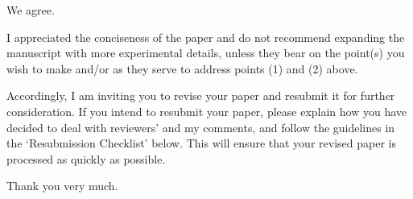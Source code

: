 \documentclass{article}
\newenvironment{response}{\smallskip \noindent \color{blue}}{\color{black}\smallskip}
\begin{document}
\begin{response}
We agree.
\end{response}

I appreciated the conciseness of the paper and do not recommend expanding the manuscript with more experimental details, unless they bear on the point(s) you wish to make and/or as they serve to address points (1) and (2) above. 

Accordingly, I am inviting you to revise your paper and resubmit it for further consideration. If you intend to resubmit your paper, please explain how you have decided to deal with reviewers’ and my comments, and follow the guidelines in the ‘Resubmission Checklist’ below. This will ensure that your revised paper is processed as quickly as possible. 

\begin{response}
Thank you very much. 
\end{response}




\end{document}
